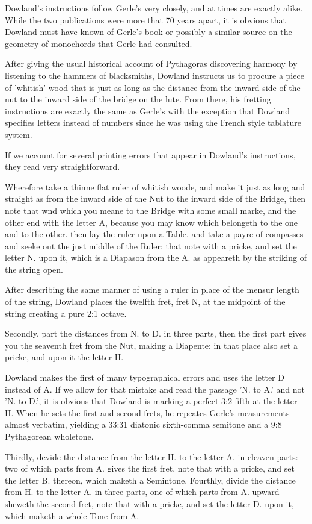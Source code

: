 Dowland's instructions follow Gerle's very closely, and at times are exactly alike.
While the two publications were more that 70 years apart, it is obvious that Dowland
must have known of Gerle's book or possibly a similar source on the geometry of
monochords that Gerle had consulted.

After giving the usual historical account of Pythagoras discovering harmony by
listening to the hammers of blacksmiths, Dowland instructs us to procure a piece
of 'whitish' wood that is just as long as the distance from the inward
side of the nut to the inward side of the bridge on the lute.  From there, his
fretting instructions are exactly the same as Gerle's with the exception that
Dowland specifies letters instead of numbers since he was using the French style
tablature system.

If we account for several printing
errors that appear in Dowland's instructions, they read very
straightforward.
\begin{blocks}
Wherefore take a thinne flat ruler of whitish woode, and make it just as long
and straight as from the inward side of the Nut to the inward side of the
Bridge, then note that wnd which you meane to the Bridge with some small marke,
and the other end with the letter A, because you may know which belongeth to the
one and to the other. then lay the ruler upon a Table, and take a payre of
compasses and seeke out the just middle of the Ruler: that note with a pricke,
and set the letter N. upon it, which is a Diapason from the A. as appeareth by
the striking of the string open.
\end{blocks}
After describing the same manner of using a ruler in place of the mensur length
of the string, Dowland places the twelfth fret, fret N, at the midpoint of the
string creating a pure 2:1 octave.
\begin{blocks}
Secondly, part the distances from N. to D. in three parts, then the first part
gives you the seaventh fret from the Nut, making a Diapente: in that place also
set a pricke, and upon it the letter H.
\end{blocks}
Dowland makes the first of many typographical errors and uses the letter D
instead of A. If we allow for that mistake and read the passage 'N. to
A.' and not 'N. to D.', it is obvious that Dowland is marking a
perfect 3:2 fifth at the letter H.  When he sets the first and
second frets, he repeates Gerle's measurements almost verbatim,
yielding a 33:31 diatonic sixth-comma semitone and a 9:8 Pythagorean wholetone.
\begin{blocks}
Thirdly, devide the distance from the letter H. to the letter A. in eleaven
parts: two of which parts from A. gives the first fret, note that with a pricke,
and set the letter B. thereon, which maketh a Semintone.  Fourthly, divide the
distance from H. to the letter A. in three parts, one of which parts from A.
upward sheweth the second fret, note that with a pricke, and set the letter D.
upon it, which maketh a whole Tone from A.
\end{blocks}
